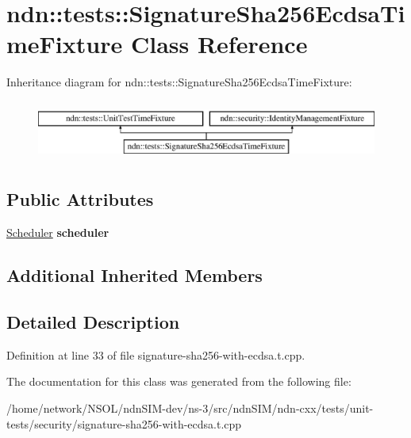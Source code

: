 \hypertarget{classndn_1_1tests_1_1SignatureSha256EcdsaTimeFixture}{}\section{ndn\+:\+:tests\+:\+:Signature\+Sha256\+Ecdsa\+Time\+Fixture Class Reference}
\label{classndn_1_1tests_1_1SignatureSha256EcdsaTimeFixture}
Inheritance diagram for ndn\+:\+:tests\+:\+:Signature\+Sha256\+Ecdsa\+Time\+Fixture\+:\begin{figure}[H]
\begin{center}
\leavevmode
\includegraphics[height=2.000000cm]{classndn_1_1tests_1_1SignatureSha256EcdsaTimeFixture}
\end{center}
\end{figure}
\subsection*{Public Attributes}
\begin{DoxyCompactItemize}
\item 
\hyperlink{classndn_1_1util_1_1scheduler_1_1Scheduler}{Scheduler} {\bfseries scheduler}\hypertarget{classndn_1_1tests_1_1SignatureSha256EcdsaTimeFixture_a411a0e6b274d32d8687df8dc7b579df0}{}\label{classndn_1_1tests_1_1SignatureSha256EcdsaTimeFixture_a411a0e6b274d32d8687df8dc7b579df0}

\end{DoxyCompactItemize}
\subsection*{Additional Inherited Members}


\subsection{Detailed Description}


Definition at line 33 of file signature-\/sha256-\/with-\/ecdsa.\+t.\+cpp.



The documentation for this class was generated from the following file\+:\begin{DoxyCompactItemize}
\item 
/home/network/\+N\+S\+O\+L/ndn\+S\+I\+M-\/dev/ns-\/3/src/ndn\+S\+I\+M/ndn-\/cxx/tests/unit-\/tests/security/signature-\/sha256-\/with-\/ecdsa.\+t.\+cpp\end{DoxyCompactItemize}
